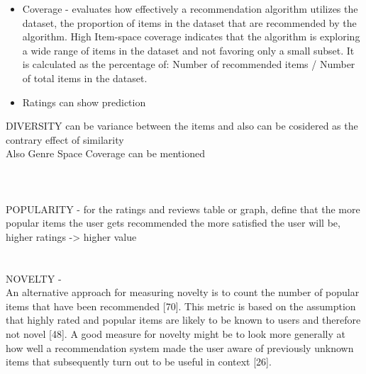 \documentclass[\myFontSize,a4paper,oneside,english,hidelinks]{article}
\begin{document}
\begin{itemize}
\item Coverage - evaluates how effectively a recommendation algorithm utilizes the dataset, the proportion of items in the dataset that are recommended by the algorithm. High Item-space coverage indicates that the algorithm is exploring a wide range of items in the dataset and not favoring only a small subset. It is calculated as the percentage of: Number of recommended items / Number of total items in the dataset.

\item Ratings can show prediction


\end{itemize}


DIVERSITY can be variance between the items and also can be cosidered as the contrary effect of similarity\cite{Silveira2019813}\\
Also Genre Space Coverage can be mentioned\\\\\\\\

POPULARITY - for the ratings and reviews table or graph, define that the more popular items the user gets recommended the more satisfied the user will be, higher ratings -> higher value\\\\\\

NOVELTY - \\
An alternative approach for measuring novelty is to count the number of popular
items that have been recommended [70]. This metric is based on the assumption
that highly rated and popular items are likely to be known to users and therefore
not novel [48]. A good measure for novelty might be to look more generally at how
well a recommendation system made the user aware of previously unknown items
that subsequently turn out to be useful in context [26].\cite{Avazpour2014245}\\
\end{document}
